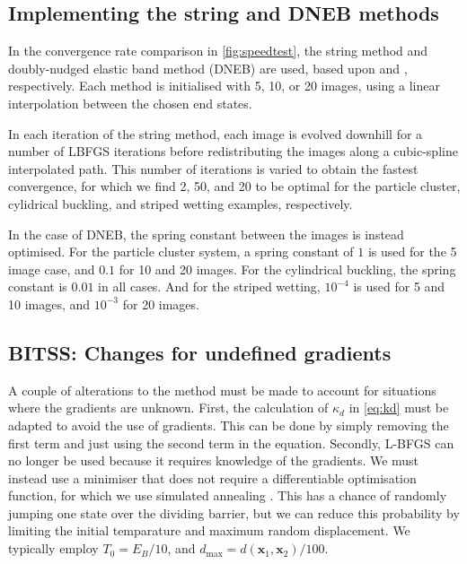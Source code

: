 \documentclass[twocolumn,10pt]{revtex4}
\begin{document}
\subsection{Implementing the string and DNEB methods}
In the convergence rate comparison in \cref{fig:speedtest}, the string method and doubly-nudged elastic band method (DNEB) are used, based upon \cite{E2007} and \cite{Trygubenko2004}, respectively.
Each method is initialised with 5, 10, or 20 images, using a linear interpolation between the chosen end states.

In each iteration of the string method, each image is evolved downhill for a number of LBFGS iterations before redistributing the images along a cubic-spline interpolated path.
This number of iterations is varied to obtain the fastest convergence, for which we find 2, 50, and 20 to be optimal for the particle cluster, cylidrical buckling, and striped wetting examples, respectively.

In the case of DNEB, the spring constant between the images is instead optimised.
For the particle cluster system, a spring constant of $1$ is used for the 5 image case, and $0.1$ for 10 and 20 images.
For the cylindrical buckling, the spring constant is $0.01$ in all cases.
And for the striped wetting, $10^{-4}$ is used for 5 and 10 images, and $10^{-3}$ for 20 images.

\subsection{BITSS: Changes for undefined gradients}
A couple of alterations to the method must be made to account for situations where the gradients are unknown.
First, the calculation of $\kappa_d$ in \cref{eq:kd} must be adapted to avoid the use of gradients.
This can be done by simply removing the first term and just using the second term in the equation.
Secondly, L-BFGS can no longer be used because it requires knowledge of the gradients.
We must instead use a minimiser that does not require a differentiable optimisation function, for which we use simulated annealing \cite{Kirkpatrick1983}.
This has a chance of randomly jumping one state over the dividing barrier, but we can reduce this probability by limiting the initial temparature and maximum random displacement.
We typically employ $T_0 = E_B / 10$, and $d_\text{max} = d(\bm{x}_1, \bm{x}_2) / 100$.
\end{document}
